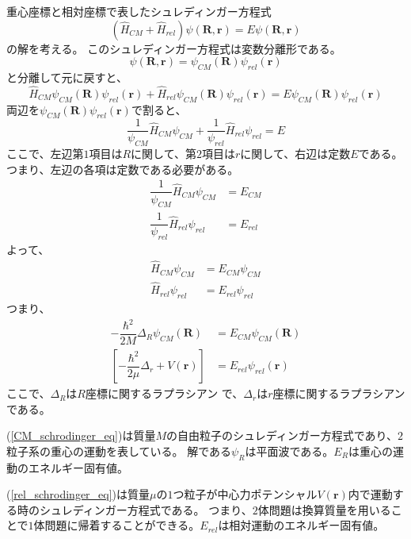 \documentclass[dvipdfmx,a4paper,16pt]{jsarticle}
\begin{document}
重心座標と相対座標で表したシュレディンガー方程式
\begin{equation}
	(\hat{H}_{CM} + \hat{H}_{rel})\psi(\bm{R},\bm{r}) = E\psi(\bm{R},\bm{r})
\end{equation}
の解を考える。
このシュレディンガー方程式は変数分離形である。
\begin{equation}
	\psi(\bm{R},\bm{r}) = \psi_{CM}(\bm{R})\psi_{rel}(\bm{r})
\end{equation}
と分離して元に戻すと、
\begin{equation}
	\hat{H}_{CM}\psi_{CM}(\bm{R})\psi_{rel}(\bm{r}) + \hat{H}_{rel}\psi_{CM}(\bm{R})\psi_{rel}(\bm{r}) = E\psi_{CM}(\bm{R})\psi_{rel}(\bm{r})
\end{equation}
両辺を$\psi_{CM}(\bm{R})\psi_{rel}(\bm{r})$で割ると、
\begin{equation}
	\dfrac{1}{\psi_{CM}}\hat{H}_{CM}\psi_{CM} + \dfrac{1}{\psi_{rel}}\hat{H}_{rel}\psi_{rel} = E
\end{equation}
ここで、左辺第$1$項目は$R$に関して、第$2$項目は$r$に関して、右辺は定数$E$である。
つまり、左辺の各項は定数である必要がある。
\begin{align}
	\dfrac{1}{\psi_{CM}}\hat{H}_{CM}\psi_{CM} &= E_{CM} \\
	\dfrac{1}{\psi_{rel}}\hat{H}_{rel}\psi_{rel} &= E_{rel}
\end{align}
よって、
\begin{align}
	\hat{H}_{CM}\psi_{CM} &= E_{CM}\psi_{CM} \\
	\hat{H}_{rel}\psi_{rel} &= E_{rel}\psi_{rel}
\end{align}
つまり、
\begin{align}
	\label{CM_schrodinger_eq}
	-\dfrac{\hbar^2}{2M}\Delta_R\psi_{CM}(\bm{R}) &= E_{CM}\psi_{CM}(\bm{R}) \\
	\label{rel_schrodinger_eq}
	\left[ -\dfrac{\hbar^2}{2\mu}\Delta_r + V(\bm{r})\right] &= E_{rel}\psi_{rel}(\bm{r})
\end{align}
ここで、$\Delta_R$は$R$座標に関するラプラシアン で、$\Delta_r$は$r$座標に関するラプラシアンである。

(\ref{CM_schrodinger_eq})は質量$M$の自由粒子のシュレディンガー方程式であり、$2$粒子系の重心の運動を表している。
解である$\psi_R$は平面波である。$E_R$は重心の運動のエネルギー固有値。

(\ref{rel_schrodinger_eq})は質量$\mu$の$1$つ粒子が中心力ポテンシャル$V(\bm{r})$内で運動する時のシュレディンガー方程式である。
つまり、$2$体問題は換算質量を用いることで$1$体問題に帰着することができる。$E_{rel}$は相対運動のエネルギー固有値。
\end{document}
